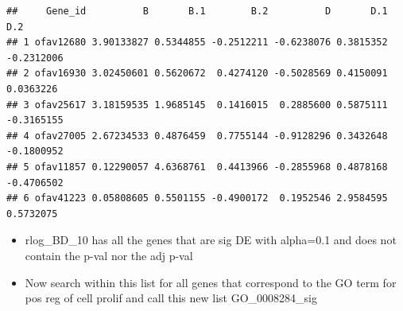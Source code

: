 \documentclass[
]{article}
\newenvironment{Shaded}{\begin{snugshade}}{\end{snugshade}}
\newcommand{\DataTypeTok}[1]{\textcolor[rgb]{0.13,0.29,0.53}{#1}}
\newcommand{\DecValTok}[1]{\textcolor[rgb]{0.00,0.00,0.81}{#1}}
\newcommand{\KeywordTok}[1]{\textcolor[rgb]{0.13,0.29,0.53}{\textbf{#1}}}
\newcommand{\NormalTok}[1]{#1}
\newcommand{\OperatorTok}[1]{\textcolor[rgb]{0.81,0.36,0.00}{\textbf{#1}}}
\newcommand{\OtherTok}[1]{\textcolor[rgb]{0.56,0.35,0.01}{#1}}
\newcommand{\StringTok}[1]{\textcolor[rgb]{0.31,0.60,0.02}{#1}}
\begin{document}
\begin{Shaded}
\end{Shaded}

\begin{verbatim}
##     Gene_id          B       B.1        B.2          D       D.1        D.2
## 1 ofav12680 3.90133827 0.5344855 -0.2512211 -0.6238076 0.3815352 -0.2312006
## 2 ofav16930 3.02450601 0.5620672  0.4274120 -0.5028569 0.4150091  0.0363226
## 3 ofav25617 3.18159535 1.9685145  0.1416015  0.2885600 0.5875111 -0.3165155
## 4 ofav27005 2.67234533 0.4876459  0.7755144 -0.9128296 0.3432648 -0.1800952
## 5 ofav11857 0.12290057 4.6368761  0.4413966 -0.2855968 0.4878168 -0.4706502
## 6 ofav41223 0.05808605 0.5501155 -0.4900172  0.1952546 2.9584595  0.5732075
\end{verbatim}

\begin{itemize}
\item
  rlog\_BD\_10 has all the genes that are sig DE with alpha=0.1 and does
  not contain the p-val nor the adj p-val
\item
  Now search within this list for all genes that correspond to the GO
  term for pos reg of cell prolif and call this new list
  GO\_0008284\_sig
\end{itemize}

\begin{Shaded}
\end{Shaded}
\end{document}
